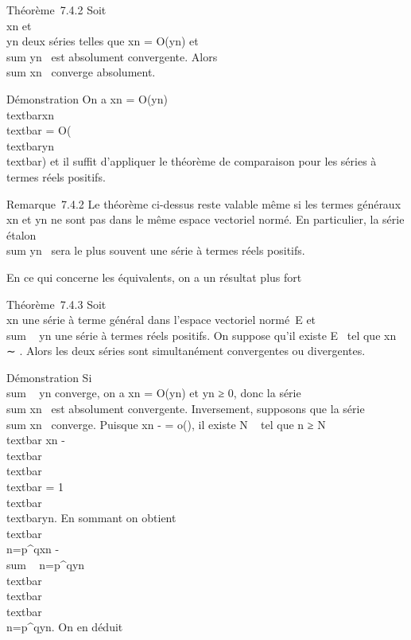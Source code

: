 Théorème~7.4.2 Soit \\\sum
 xn et \\\sum
 yn deux séries telles que xn = O(yn)
et \\sum  yn~
est absolument convergente. Alors
\\sum  xn~
converge absolument.

Démonstration On a xn = O(yn)
\Leftrightarrow
\\textbar{}xn\\textbar{} =
O(\\textbar{}yn\\textbar{}) et
il suffit d'appliquer le théorème de comparaison pour les séries à
termes réels positifs.

Remarque~7.4.2 Le théorème ci-dessus reste valable même si les termes
généraux xn et yn ne sont pas dans le même espace
vectoriel normé. En particulier, la série étalon
\\sum  yn~ sera
le plus souvent une série à termes réels positifs.

En ce qui concerne les équivalents, on a un résultat plus fort

Théorème~7.4.3 Soit \\\sum
 xn une série à terme général dans l'espace vectoriel
normé~E et \\sum ~
yn une série à termes réels positifs. On suppose qu'il existe
\ell \in E \diagdown\0\ tel que xn ∼
\ellyn. Alors les deux séries sont simultanément convergentes ou
divergentes.

Démonstration Si \\sum ~
yn converge, on a xn = O(yn) et
yn ≥ 0, donc la série
\\sum  xn~ est
absolument convergente. Inversement, supposons que la série
\\sum  xn~
converge. Puisque xn - \ellyn = o(\ellyn), il
existe N \in {}~ tel que n ≥ N \rigtharrow~\\textbar{} xn -
\ellyn\\textbar{}  
\\textbar{}\ellyn\\textbar{} = 1
\\textbar{}\ell\\textbar{}yn. En
sommant on obtient
\\textbar{}\\\sum
 n=p^qxn -
\ell\\sum ~
n=p^qyn\\textbar{} 
\\textbar{}\ell\\textbar{}\\\sum
 n=p^qyn. On en déduit

